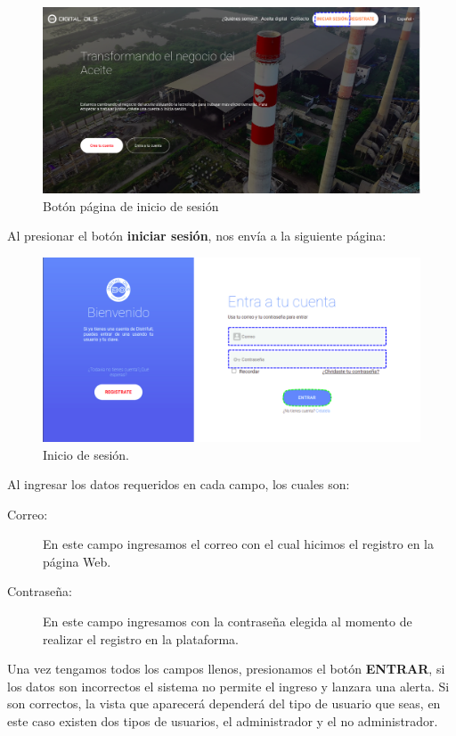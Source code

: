 \begin{figure}[h!]
	\centering
	\includegraphics[width=0.8\linewidth, height=0.2\textheight]{imagenes/inicioOneTE.png}
	\caption[Primera parte del inicio.]{Bot\'on p\'agina de inicio de sesi\'on}
	\label{fig:inicioonet}
\end{figure}
Al presionar el bot\'on \textcolor{orangedistri}{{\bf iniciar sesi\'on}}, nos env\'ia a la siguiente p\'agina:
\begin{figure}[h!]
	\centering
	\includegraphics[width=0.9\linewidth, height=0.3\textheight]{imagenes/inicioSe}
	\caption[Inicio de sesi\'on.]{Inicio de sesi\'on.}
	\label{fig:iniciosesion}
\end{figure}
\newpage
Al ingresar los datos requeridos en cada campo, los cuales son: 
\begin{description}
	\item[Correo: ] En este campo ingresamos el correo con el cual hicimos el registro en la p\'agina Web.
	\item[Contrase\~na: ] En este campo ingresamos con la contrase\~na elegida al momento de realizar el registro en la plataforma.
\end{description}
Una vez tengamos todos los campos llenos, presionamos el bot\'on \textcolor{bluedistri}{{\bf\rm ENTRAR}}, si los datos son incorrectos el sistema no permite el ingreso y lanzara una alerta. Si son correctos, la 
vista que aparecer\'a depender\'a del tipo de usuario que seas, en este caso existen dos tipos de usuarios, el administrador y el no administrador.

